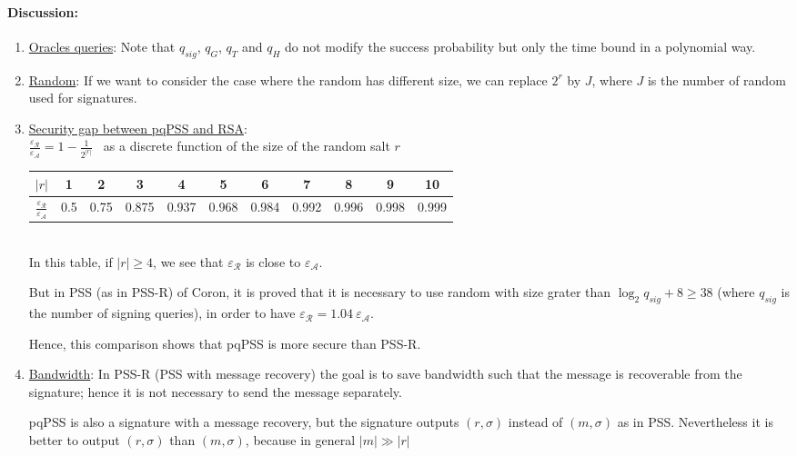 \documentclass[a4paper,11pt]{article}
\begin{document}
\paragraph{Discussion:}
\begin{enumerate}
\item  \underline{Oracles queries}: Note that $q_{sig}$, $q_{G}$, $q_{T}$ and  $q_{H}$ do not modify the success probability but only the time bound in a polynomial way.

 \item \underline{Random}:  If we want to consider the case where the random has different size, we can replace $2^{r}$ by $J$, where $J$ is the number of random used for signatures.

\item  \underline{Security gap between pqPSS and RSA}: \\

$\frac{\varepsilon_{\mathcal{R}}}{\varepsilon_{\mathcal{A}}}=1-\frac{1}{2^{|r|}}$ \ as a discrete function of the size of the random salt $r$ \\

\begin{tabular}{|c|c|c|c|c|c|c|c|c|c|c|}
 \hline  %
  $|r|$ & 1 & 2 & 3 & 4 & 5 & 6 & 7 & 8 & 9  & 10 \\
 \hline
   $\frac{\varepsilon_{\mathcal{R}}}{\varepsilon_{\mathcal{A}}}$ & 0.5 & 0.75 & 0.875 & 0.937 & 0.968 & 0.984 & 0.992 & 0.996 & 0.998 & 0.999 \\
  \hline
\end{tabular}
\\

In this table,  if $|r|\geq 4$, we see that $\varepsilon_{\mathcal{R}}$ is close to $\varepsilon_{\mathcal{A}}$.

But in PSS (as in PSS-R) of Coron, it is proved that it is necessary to use  random with size grater than $\log_{2}q_{sig}+8 \geq 38$  (where $q_{sig}$ is the number of signing queries), in order to have $\varepsilon_{\mathcal{R}}=1.04 \ \varepsilon_{\mathcal{A}}$.

Hence, this comparison shows that pqPSS is more secure than PSS-R.

\item \underline{Bandwidth}: In PSS-R (PSS with message recovery) the goal is to save bandwidth such that the message is recoverable from the signature; hence it is not necessary to send the message separately.

pqPSS is also a signature with a message recovery, but the signature outputs $(r,\sigma)$ instead of $(m,\sigma)$ as in PSS. Nevertheless it is better to output $(r,\sigma)$ than $(m,\sigma)$, because in general $|m|\gg |r|$



\end{enumerate}
\end{document}
